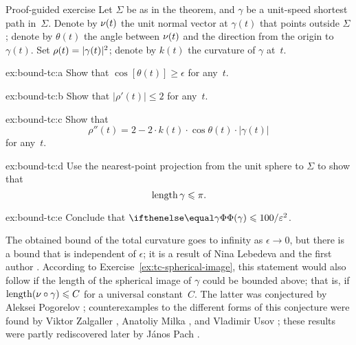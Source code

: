 \begin{thm}{Proof-guided exercise}\label{ex:bound-tc}
Let $\Sigma$ be as in the theorem, and $\gamma$ be a unit-speed shortest path in~$\Sigma$.
Denote by $\nu(t)$ the unit normal vector at $\gamma(t)$ that points outside $\Sigma$;
denote by $\theta(t)$ the angle between $\nu(t)$ and the direction from the origin to $\gamma(t)$.
Set $\rho(t)\z=|\gamma(t)|^2$; denote by $k(t)$ the curvature of $\gamma$ at~$t$.

\begin{subthm}{ex:bound-tc:a}
Show that $\cos[\theta(t)]\ge \epsilon$ for any~$t$.
\end{subthm}

\begin{subthm}{ex:bound-tc:b}
 Show that $|\rho'(t)|\le 2$ for any~$t$.
\end{subthm}

\begin{subthm}{ex:bound-tc:c}
 Show that 
\[\rho''(t)=2-2\cdot k(t)\cdot \cos \theta(t)\cdot |\gamma(t)|\]
for any~$t$.
\end{subthm}

\begin{subthm}{ex:bound-tc:d}
 Use the nearest-point projection from the unit sphere to $\Sigma$ to show that 
\[\mathop{\rm length}\nolimits \gamma\leqslant \pi.\]
\end{subthm}

\begin{subthm}{ex:bound-tc:e}
Conclude that $\tc\gamma\le 100/\epsilon^2$.
\end{subthm}

\end{thm}

The obtained bound of the total curvature goes to infinity as $\epsilon\to 0$,
but there is a bound that is independent of $\epsilon$;
it is a result of Nina Lebedeva and the first author \cite{lebedeva-petrunin}.
According to Exercise~\ref{ex:tc-spherical-image}, this statement would also follow if the length of the spherical image of $\gamma$ could be bounded above; 
that is, if $\mathop{\rm length}\nolimits(\nu\circ\gamma)\leqslant C$ for a universal constant~$C$.
The latter was conjectured by Aleksei Pogorelov \cite{pogorelov};
counterexamples to the different forms of this conjecture were found 
by Viktor Zalgaller \cite{zalgaller},
Anatoliy Milka \cite{milka},
and Vladimir Usov \cite{usov};
these results were partly rediscovered later 
by J\'{a}nos Pach \cite{pach}.
